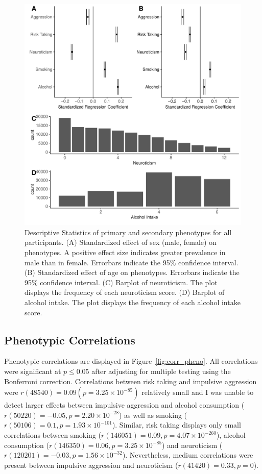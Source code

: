 \begin{figure}[htpb]
  \centering
  \includegraphics[width=0.8\linewidth]{ukb_assoc/figure/phenotype/descriptives_plots.pdf}
  \caption[Descriptive Statistics of Primary and Secondary Phenotypes]{
    Descriptive Statistics of primary and secondary phenotypes for all participants.
    (A) Standardized effect of sex (male, female) on phenotypes. 
    A positive effect size indicates greater prevalence in male than in female.
    Errorbars indicate the 95\% confidence interval.
    (B) Standardized effect of age on phenotypes.
    Errorbars indicate the 95\% confidence interval.
    (C) Barplot of neuroticism.
    The plot displays the frequency of each neuroticism score.
    (D) Barplot of alcohol intake.
    The plot displays the frequency of each alcohol intake score.
  }\label{fig:disc}
\end{figure}

\subsection{Phenotypic Correlations}
\label{sub:phenotype_correlations}

Phenotypic correlations are displayed in Figure~\ref{fig:corr_pheno}. 
All correlations were significant at $p\leq 0.05$ after adjusting for multiple testing using the Bonferroni correction.
Correlations between risk taking and impulsive aggression were $r(48540)=0.09 (p=3.25\times 10^{-85})$ relatively small
and I was unable to detect larger effects between impulsive aggression and alcohol consumption ($r(50220)=-0.05, p=2.20\times 10^{-28}$)
as well as smoking ($r(50106)=0.1, p=1.93\times 10^{-101}$).
Similar, risk taking displays only small correlations between
smoking ($r(146051)=0.09, p=4.07\times 10^{-260}$),
alcohol consumption ($r(146350)=0.06, p=3.25\times 10^{-85}$)
and neuroticism ($r(120201)=-0.03, p=1.56\times 10^{-32}$). 
Nevertheless, medium correlations were present between impulsive aggression and neuroticism ($r(41420)=0.33, p=0$).

